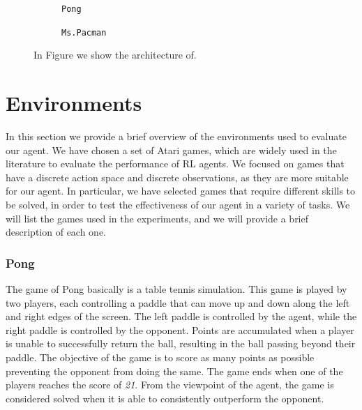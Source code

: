 \begin{figure}[ht]
    \centering
    \begin{subfigure}[b]{0.47\textwidth}
        \centering
        \fbox{\rule[-.5cm]{0cm}{4cm} \rule[-.5cm]{4cm}{0cm}}
        \caption{\texttt{Pong}}
        \label{fig:reservoir_combination}
    \end{subfigure}
    \hfill
    \begin{subfigure}[b]{0.47\textwidth}
        \centering
        \fbox{\rule[-.5cm]{0cm}{4cm} \rule[-.5cm]{4cm}{0cm}}
        \caption{\texttt{Ms.Pacman}}
        \label{fig:dpa}
    \end{subfigure}

    \caption{In Figure we show the architecture of.}
    \label{fig:dpa_combination}
\end{figure}

\section{Environments}
\label{sec:environments}
In this section we provide a brief overview of the environments used to evaluate our agent.
We have chosen a set of Atari games, which are widely used in the literature to evaluate the performance of RL agents.
We focused on games that have a discrete action space and discrete observations, as they are more suitable for our agent.
In particular, we have selected games that require different skills to be solved, in order to test the effectiveness of our agent in a variety of tasks.
We will list the games used in the experiments, and we will provide a brief description of each one.

\subsubsection{Pong}
The game of Pong basically is a table tennis simulation.
This game is played by two players, each controlling a paddle that can move up and down along the left and right edges of the screen.
The left paddle is controlled by the agent, while the right paddle is controlled by the opponent.
Points are accumulated when a player is unable to successfully return the ball, resulting in the ball passing beyond their paddle.
The objective of the game is to score as many points as possible preventing the opponent from doing the same.
The game ends when one of the players reaches the score of \textit{21}.
From the viewpoint of the agent, the game is considered solved when it is able to consistently outperform the opponent.


